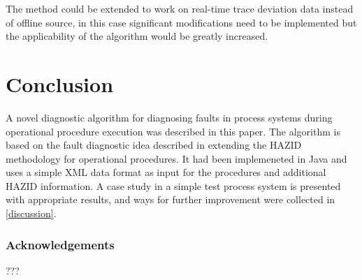 \documentclass[conference]{IEEEtran}
\begin{document}
The method could be extended to work on real-time trace deviation data instead of offline source, in this case significant modifications need to be implemented but the applicability of the algorithm would be greatly increased.

\section{Conclusion}
A novel diagnostic algorithm for diagnosing faults in process systems during operational procedure execution was described in this paper. The algorithm is based on the fault diagnostic idea described in \cite{KES2011} extending the HAZID methodology for operational procedures. It had been implemeneted in Java and uses a simple XML data format as input for the procedures and additional HAZID information. A case study in a simple test process system is presented with appropriate results, and ways for further improvement were collected in \ref{discussion}.

\subsubsection{Acknowledgements}

???
\end{document}
